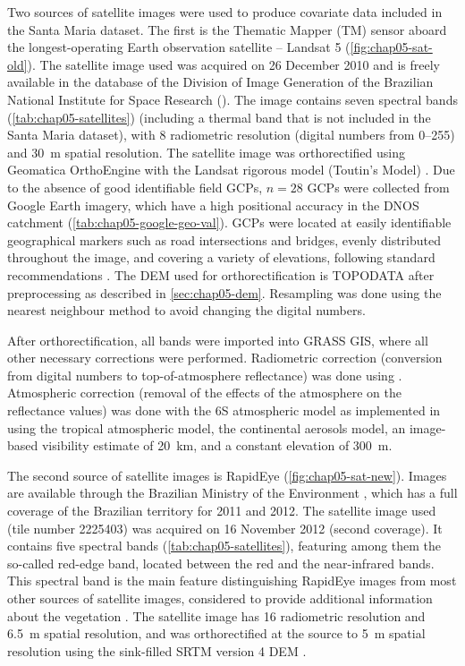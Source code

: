 Two sources of satellite images were used to produce covariate data included in the Santa Maria dataset. The 
first is the Thematic Mapper (TM) sensor aboard the longest-operating Earth observation satellite -- Landsat 
5 (\autoref{fig:chap05-sat-old}). The satellite image used was acquired on \num{26} December \num{2010} and is 
freely available in the database of the Division of Image Generation of the Brazilian National Institute for 
Space Research (\inpedgi). The image contains seven spectral bands (\autoref{tab:chap05-satellites}) 
(including a thermal band that is not included in the Santa Maria dataset), with \SI{8}{\bit} radiometric 
resolution (digital numbers from \numrange{0}{255}) and \SI{30}{\m} spatial resolution. The satellite image 
was orthorectified using Geomatica\rr{} OrthoEngine\rr{} with the Landsat rigorous model (Toutin's Model) 
\cite{Toutin2004, PCIGeomatics2007}. Due to the absence of good identifiable field GCPs, $n = 28$ GCPs were 
collected from Google Earth\rr{} imagery, which have a high positional accuracy in the DNOS catchment 
(\autoref{tab:chap05-google-geo-val}). GCPs were located at easily identifiable geographical markers such as 
road intersections and bridges, evenly distributed throughout the image, and covering a variety of elevations, 
following standard recommendations \cite{PCIGeomatics2007}. 
The DEM used for orthorectification is TOPODATA after preprocessing as described in \autoref{sec:chap05-dem}. 
Resampling was done using the nearest neighbour method to avoid changing the digital numbers.

After orthorectification, all bands were imported into GRASS GIS, where all other necessary corrections were 
performed. Radiometric correction (conversion from digital numbers to top-of-atmosphere reflectance) was done 
using . Atmospheric correction (removal of the effects of the atmosphere on the 
reflectance values) was done with the 6S atmospheric model \cite{VermoteEtAl1997} as implemented in 
 using the tropical atmospheric model, the continental aerosols model, an image-based 
visibility estimate of \SI{20}{\km}, and a constant elevation of \SI{300}{\m}.

The second source of satellite images is RapidEye (\autoref{fig:chap05-sat-new}). Images are available through 
the Brazilian Ministry of the Environment \cite{Brasil2012}, which has a full coverage of the Brazilian 
territory for \num{2011} and \num{2012}. The satellite image used (tile number \num{2225403}) was acquired on 
\num{16} November \num{2012} (second coverage). It contains five spectral bands 
(\autoref{tab:chap05-satellites}), featuring among them the so-called red-edge band, located between the red 
and the near-infrared bands. This spectral band is the main feature distinguishing RapidEye images from most 
other sources of satellite images, considered to provide additional information about the vegetation 
\cite{WeicheltEtAl2013}. The satellite image has \SI{16}{\bit} radiometric resolution and \SI{6.5}{\m} spatial 
resolution, and was orthorectified at the source to \SI{5}{\m} spatial resolution using the sink-filled SRTM 
version \num{4} DEM \cite{RapidEye2013}.

